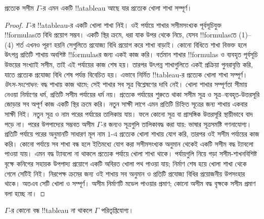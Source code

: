 \documentclass[../../../include/open-logic-section]{subfiles}
\begin{document}
\begin{prop}
  প্রত্যেক সসীম $\Gamma$-র এমন একটি !!a{tableau} আছে যার
  প্রত্যেক খোলা শাখা সম্পূর্ণ।
\end{prop}

\begin{proof}
  $\Gamma$-র !!a{tableau}-র একটি খোলা শাখা নিই।
  ওই পর্যায়ে শাখার সসীমসংখ্যক পূর্বসূচিযুক্ত !!{formula}sতে
  বিধি প্রয়োগ সম্ভব। একটি স্থির ক্রমে, ধরা যাক উপর থেকে
  নিচে, যেসব !!{formula}sতে (1)--(4) শর্ত এখনও পূরণ হয়নি সেগুলিতে
  প্রযোজ্য বিধি প্রয়োগ করে শাখা বাড়াই। কোনো বিধিতে
  শাখা বিভক্ত হলে উৎপন্ন প্রতিটি শাখায় অবশিষ্ট !!{formula}sর
  জন্য একই কাজ করি। বর্তমান শাখার !!{formula}s ও ব্যবহৃত পূর্বসূচি
  উভয়ের সংখ্যাই সসীম, তাই এই পর্যায়ের কাজ শেষ হয়।
  তারপর উৎপন্ন শাখাগুলিতে একই প্রক্রিয়া পুনরাবৃত্তি করি,
  যাতে প্রত্যেক প্রযোজ্য বিধি শেষ পর্যন্ত বিবেচিত হয়।
  এভাবে নির্মিত !!{tableau}-র প্রত্যেক খোলা শাখা সম্পূর্ণ।
  \emph{উৎস-সংশোধন:} বদ্ধ শাখায় কাজ থামে; সেই শাখার সব সূত্র বিশ্লেষণের দাবি নেই। খোলা শাখার সম্পূর্ণতা সীমায় নেওয়া নির্মাণের ধর্ম, প্রতিটি সসীম পর্যায়ের ধর্ম নয়। প্রত্যেক পর্যায়ের শুরুতে থাকা সসীম সূত্র ও সূত্র--ব্যবহৃত-উত্তরসূরি জোড়ার সব অপূর্ণ কাজ একটি স্থির ক্রমে করি। নতুন সাক্ষী লাগে এমন প্রতিটি চিহ্নিত সূত্রের জন্য শাখায় একবার সাক্ষী নিই। নতুন সূত্র ও নাম পরের পর্যায়ের তালিকায় যায়। ফলে কোনো সূত্র বা প্রাসঙ্গিক উত্তরসূরি স্থায়ীভাবে বাদ পড়ে না।
  পরের উপপাদ্যের সম্ভবত অসীম $\Gamma$-র জন্যও সূত্রগুলি তালিকাবদ্ধ করা যায়: ভাষার সূত্রসমষ্টি গণনাযোগ্য। প্রতিটি পর্যায়ে পরের অনুমানটি সাধারণ মূল নাম $1$-এ প্রত্যেক খোলা শাখায় যোগ করি, তারপর ওই সসীম পর্যায়ের কাজ করি। কোনো পর্যায়ে সব শাখা বন্ধ হলে ইতিমধ্যে যোগ করা সসীমসংখ্যক অনুমান থেকেই একটি সসীম বদ্ধ ট্যাবলো পাওয়া যায়। এমন বদ্ধ ট্যাবলো না থাকলে প্রত্যেক পর্যায়ে খোলা শাখা থাকে। পর্যায়গুলি নিয়ে গড়া সসীম-শাখনবিশিষ্ট বৃক্ষে কনিগের সহায়ক উপপাদ্য প্রয়োগে একটি অবিরত খোলা পথ পাওয়া যায়; নির্মাণ শেষ হয়ে খোলা শাখা থেকে গেলে সেটিই নিই। নিরপেক্ষ ক্রমের জন্য ওই শাখায় সব অনুমান ও প্রতিটি প্রযোজ্য বিধির প্রয়োজনীয় উপসংহার থাকে। অতএব সেটি খোলা ও সম্পূর্ণ। অসীম নির্মাণটি মডেল পাওয়ার প্রমাণ; কোনো অসীম বদ্ধ বৃক্ষকে সসীম প্রমাণ বলা হচ্ছে না।
\end{proof}

\begin{thm}[সম্পূর্ণতা]
  $\Gamma$-র কোনো বন্ধ !!{tableau} না থাকলে
  $\Gamma$ পরিতৃপ্তিযোগ্য।
\end{thm}
\end{document}
